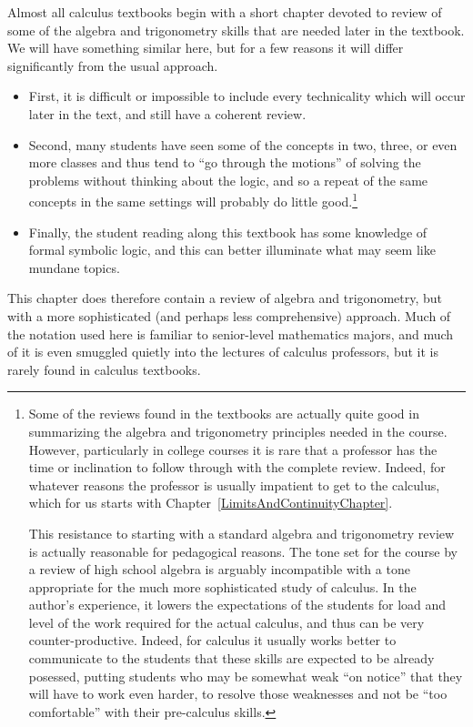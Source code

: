 Almost all calculus textbooks begin with a short chapter devoted 
to review of
some of the algebra and trigonometry skills that are needed later
in the textbook.  We will have something similar here, but 
for a few reasons it will differ significantly from the usual 
approach.
\begin{itemize}
\item  First, it is difficult or impossible to include every 
technicality which will occur later in the text, and still have
a coherent review.  
\item Second, many students have seen some of the concepts
in two, three, or even more classes and thus tend 
to ``go through the motions'' of solving the problems
without thinking about the logic, and so a repeat of the same concepts
in the same settings will probably do little good.\footnote{%
Some of the reviews found in the textbooks are actually quite good
in summarizing the algebra and trigonometry principles needed
in the course.  However, particularly in college courses 
it is rare that a professor
has the time or inclination to follow through with the complete review.
Indeed, for whatever reasons the professor is usually impatient to get
to the calculus, which for us starts with 
Chapter~\ref{LimitsAndContinuityChapter}.  

This resistance to starting
with a standard algebra and trigonometry review is actually reasonable
for pedagogical reasons.  The tone
set for the course by a review of high school algebra is arguably
incompatible with a tone appropriate for the much more sophisticated
study of calculus.  In the author's experience, it lowers the expectations
of the students for load and level of the work required for the 
actual calculus, and thus can be very counter-productive.  Indeed, for
calculus it usually works better to communicate to the students
that these skills are expected to be already posessed, putting students
who may be somewhat weak ``on notice'' that they will have to
work even harder, to resolve those weaknesses and not be ``too comfortable''
with their pre-calculus skills.%
}
\item
Finally, the student reading along this textbook has some knowledge
of formal symbolic logic, and this can better illuminate
what may seem like mundane topics. 
\end{itemize}


This chapter does therefore contain a review of algebra
and trigonometry, but with a more sophisticated
(and perhaps less comprehensive) approach.
Much of the notation used here is familiar to senior-level
mathematics majors, and much of it is even smuggled quietly
into the lectures of calculus professors, but it is rarely found
in calculus textbooks. 

